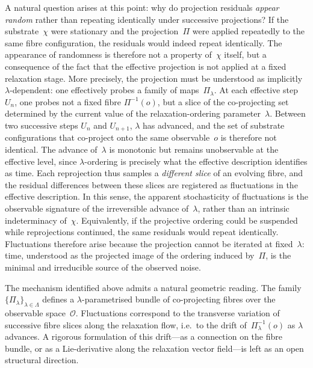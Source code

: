   A natural question arises at this point: why do projection residuals \emph{appear random}
  rather than repeating identically under successive projections?
  If the substrate~$\chi$ were stationary and the projection~$\Pi$ were applied repeatedly
  to the same fibre configuration, the residuals would indeed repeat identically.
  The appearance of randomness is therefore not a property of~$\chi$ itself, but a
  consequence of the fact that the effective projection is not applied at a fixed relaxation
  stage.
  More precisely, the projection must be understood as implicitly $\lambda$-dependent:
  one effectively probes a family of maps~$\Pi_\lambda$.
  At each effective step~$U_n$, one probes not a fixed fibre $\Pi^{-1}(o)$, but a slice of
  the co-projecting set determined by the current value of the relaxation-ordering
  parameter~$\lambda$.
  Between two successive steps $U_n$ and $U_{n+1}$, $\lambda$ has advanced, and the set
  of substrate configurations that co-project onto the same observable~$o$ is therefore
  not identical.
  The advance of~$\lambda$ is monotonic but remains unobservable at the effective level,
  since $\lambda$-ordering is precisely what the effective description identifies as time.
  Each reprojection thus samples a \emph{different slice} of an evolving fibre, and the
  residual differences between these slices are registered as fluctuations in the effective
  description.
  In this sense, the apparent stochasticity of fluctuations is the observable signature of
  the irreversible advance of~$\lambda$, rather than an intrinsic indeterminacy of~$\chi$.
  Equivalently, if the projective ordering could be suspended while reprojections continued,
  the same residuals would repeat identically.
  Fluctuations therefore arise because the projection cannot be iterated at
  fixed~$\lambda$: time, understood as the projected image of the ordering induced by~$\Pi$,
  is the minimal and irreducible source of the observed noise.

  \begin{remark}
    The mechanism identified above admits a natural geometric reading.
    The family $\{\Pi_\lambda\}_{\lambda \in \Lambda}$ defines a $\lambda$-parametrised bundle
    of co-projecting fibres over the observable space~$\mathcal{O}$.
    Fluctuations correspond to the transverse variation of successive fibre slices along the
    relaxation flow, i.e.\ to the drift of~$\Pi_\lambda^{-1}(o)$ as $\lambda$ advances.
    A rigorous formulation of this drift---as a connection on the fibre bundle, or as a
    Lie-derivative along the relaxation vector field---is left as an open structural direction.
  \end{remark}

